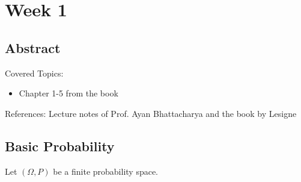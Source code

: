 \chapter{Week 1}
\label{chap:Week1}
\section*{Abstract}
Covered Topics:
    \begin{itemize}
        \item Chapter 1-5 from the book
    \end{itemize}
    References: Lecture notes of Prof. Ayan Bhattacharya \cite{Notes2024} and the book by Lesigne \cite{lesigne2005heads}
\section{Basic Probability}
Let $(\Omega,P)$ be a finite probability space. 